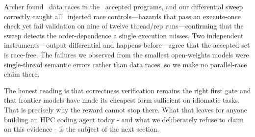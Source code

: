 Archer found \NRaces\ data races in the \NAccepted\ accepted programs, and our
differential sweep correctly caught all \NInjected\ injected race
controls---hazards that pass an execute-once check yet fail validation on nine of
twelve thread/rep runs---confirming that the sweep detects the order-dependence a
single execution misses. Two independent instruments---output-differential and
happens-before---agree that the accepted set is race-free. The failures we
observed from the smallest open-weights models were single-thread semantic
errors rather than data races, so we make no parallel-race claim there.

The honest reading is that correctness verification remains the right first
gate and that frontier models have made its cheapest form sufficient on
idiomatic tasks. That is precisely why the reward cannot stop there. What that
leaves for anyone building an HPC coding agent today - and what we deliberately
refuse to claim on this evidence - is the subject of the next section.

